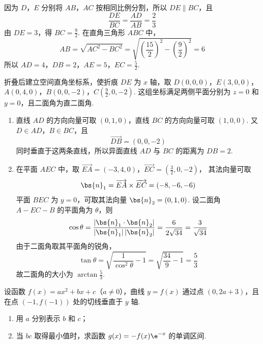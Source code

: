 \begin{solution}
因为 \(D\)，\(E\) 分别将 \(AB\)，\(AC\) 按相同比例分割，所以 \(DE\parallel BC\)，且
\[
\frac{DE}{BC}=\frac{AD}{AB}=\frac{2}{3}
\]
由 \(DE=3\)，得 \(BC=\frac{9}{2}\). 在直角三角形 \(ABC\) 中，
\[
AB=\sqrt{AC^{2}-BC^{2}}=\sqrt{\left(\frac{15}{2}\right)^{2}-\left(\frac{9}{2}\right)^{2}}=6
\]
所以 \(AD=4\)，\(DB=2\)，\(AE=5\)，\(EC=\frac{5}{2}\).

折叠后建立空间直角坐标系，使折痕 \(DE\) 为 \(x\) 轴，取
\(D(0,0,0)\)，\(E(3,0,0)\)，\(A(0,4,0)\)，\(B(0,0,-2)\)，\(C\left(\frac{9}{2},0,-2\right)\).
这组坐标满足两侧平面分别为 \(z=0\) 和 \(y=0\)，且二面角为直二面角.

\begin{enumerate}
\item 直线 \(AD\) 的方向向量可取 \((0,1,0)\)，直线 \(BC\) 的方向向量可取 \((1,0,0)\). 又 \(D\in AD\)，\(B\in BC\)，且
\[
\overrightarrow{DB}=(0,0,-2)
\]
同时垂直于这两条直线，所以异面直线 \(AD\) 与 \(BC\) 的距离为 \(DB=2\).

\item 在平面 \(AEC\) 中，取
\(\overrightarrow{EA}=(-3,4,0)\)，\(\overrightarrow{EC}=\left(\frac{3}{2},0,-2\right)\)，
其法向量可取
\[
\bs{n}_{1}=\overrightarrow{EA}\times\overrightarrow{EC}=(-8,-6,-6)
\]
平面 \(BEC\) 为 \(y=0\)，可取其法向量 \(\bs{n}_{2}=(0,1,0)\). 设二面角 \(A-EC-B\) 的平面角为 \(\theta\)，则
\[
\cos\theta=\frac{|\bs{n}_{1}\cdot\bs{n}_{2}|}{|\bs{n}_{1}|\,|\bs{n}_{2}|}=\frac{6}{2\sqrt{34}}=\frac{3}{\sqrt{34}}
\]
由于二面角取其平面角的锐角，
\[
\tan\theta=\sqrt{\frac{1}{\cos^{2}\theta}-1}=\sqrt{\frac{34}{9}-1}=\frac{5}{3}
\]
故二面角的大小为 \(\arctan\frac{5}{3}\).
\end{enumerate}
\end{solution}

\begin{problem}
设函数 \( f(x) = ax^2 + bx + c\)（\(a \neq 0\)），曲线 \( y = f(x) \) 通过点 \((0, 2a + 3)\)，且在点 \((-1, f(-1))\) 处的切线垂直于 \(y\) 轴.
\begin{enumerate}
\item 用 \(a\) 分别表示 \(b\) 和 \(c\)；
\item 当 \(bc\) 取得最小值时，求函数 \(g(x) = -f(x)\e^{-x}\) 的单调区间.
\end{enumerate}
\end{problem}

